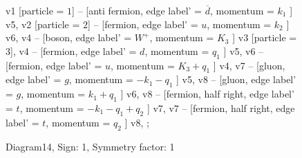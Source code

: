 \documentclass{revtex4}
\begin{document}
\begin{figure}[!htb]
\begin{center}
{    %
v1 [particle = \(1\)] -- [anti fermion, edge label' = \(\overline{d}\), momentum = \(k_{1}\) ] v5, 
v2 [particle = \(2\)] -- [fermion, edge label' = \(u\), momentum = \(k_{2}\) ] v6, 
v4 -- [boson, edge label' = \(W^{+}\), momentum = \(K_{3}\) ] v3 [particle = \(3\)], 
v4 -- [fermion, edge label' = \(d\), momentum = \(q_{1}\) ] v5, 
v6 -- [fermion, edge label' = \(u\), momentum = \(K_{3} + q_{1}\) ] v4, 
v7 -- [gluon, edge label' = \(g\), momentum = \(-k_{1} - q_{1}\) ] v5, 
v8 -- [gluon, edge label' = \(g\), momentum = \(k_{1} + q_{1}\) ] v6, 
v8 -- [fermion, half right, edge label' = \(t\), momentum = \(-k_{1} - q_{1} + q_{2}\) ] v7, 
v7 -- [fermion, half right, edge label' = \(t\), momentum = \(q_{2}\) ] v8, 
};
\end{center}
\caption{Diagram14, Sign: 1, Symmetry factor: 1}
\end{figure}
\newpage
\end{document}
